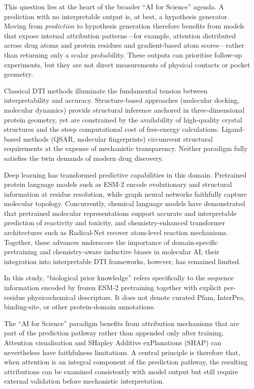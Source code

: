 \documentclass[fleqn,10pt]{wlscirep}
\begin{document}
This question lies at the heart of the broader ``AI for Science'' agenda.  A
prediction with no interpretable output is, at best, a hypothesis generator.
Moving from \emph{prediction} to hypothesis generation therefore benefits from
models that expose internal attribution patterns---for example, attention
distributed across drug atoms and protein residues and gradient-based atom
scores---rather than returning only a scalar probability.  These outputs can
prioritise follow-up experiments, but they are not direct measurements of
physical contacts or pocket geometry.

Classical DTI methods illuminate the fundamental tension between interpretability
and accuracy.  Structure-based approaches (molecular docking, molecular dynamics)
provide structural inference anchored in three-dimensional protein
geometry,\cite{kitchen2004docking} yet are constrained by the availability of
high-quality crystal structures and the steep computational cost of free-energy
calculations.  Ligand-based methods (QSAR, molecular
fingerprints)\cite{cherkasov2014qsar} circumvent structural requirements at
the expense of mechanistic transparency.  Neither paradigm fully satisfies the
twin demands of modern drug discovery.

Deep learning has transformed predictive capabilities in this domain.
Pretrained protein language models such as ESM-2\cite{lin2023evolutionary}
encode evolutionary and structural information at residue resolution, while
graph neural networks faithfully capture molecular topology.  Concurrently,
chemical language models have demonstrated that pretrained molecular
representations support accurate and interpretable prediction of reactivity and
toxicity,\cite{huang2025large} and chemistry-enhanced transformer
architectures such as Radical-Net recover atom-level reaction
mechanisms.\cite{huang2025radical}  Together, these advances underscore
the importance of domain-specific pretraining and chemistry-aware inductive
biases in molecular AI;\cite{huang2024ai} their integration into
interpretable DTI frameworks, however, has remained limited.

In this study, ``biological prior knowledge'' refers specifically to the
sequence information encoded by frozen ESM-2 pretraining together with explicit
per-residue physicochemical descriptors. It does not denote curated Pfam,
InterPro, binding-site, or other protein-domain annotations.

The ``AI for Science'' paradigm benefits from attribution mechanisms that are
part of the prediction pathway rather than appended only after training.
Attention visualisation and SHapley Additive exPlanations (SHAP) can nevertheless
have faithfulness limitations.\cite{jain2019attention} A central principle is
therefore that, when attention is an integral component of the prediction
pathway, the resulting attributions can be examined consistently with model
output but still require external validation before mechanistic interpretation.
\end{document}
